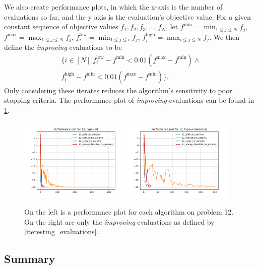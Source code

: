 We also create performance plots, in which the x-axis is the number of evaluations so far, and the y axis is the evaluation's objective value.
For a given constant sequence of objective values $f_1, f_2, f_3, \ldots, f_N$, let 
$f^{\textrm{min}} = \min_{1\le j\le N} f_j$,
$f^{\textrm{max}} = \max_{1\le j\le N} f_j$,
$f^{\textrm{low}}_i = \min_{1\le j\le i} f_j$,
$f^{\textrm{high}}_i = \max_{i \le j\le N} f_j$.
We then define the {\em improving} evaluations to be 
\begin{align}
\bigg\{i \in [N] \bigg | 
f^{\textrm{low}}_i - f^{\textrm{min}} < 0.01\left(f^{\textrm{max}} - f^{\textrm{min}}\right) \wedge \nonumber \\
f^{\textrm{high}}_i - f^{\textrm{min}} < 0.01\left(f^{\textrm{max}} - f^{\textrm{min}}\right)
\bigg\}.
\label{iteresting_evaluations}
\end{align}
Only considering these iterates reduces the algorithm's sensitivity to poor stopping criteria.
The performance plot of {\em improving} evaluations can be found in \cref{example_interesting_performance_profile}.

\begin{figure}[ht]
    \centering
    \includegraphics[width=200px]{images/12_all.png}
    \includegraphics[width=200px]{images/12_interesting.png}
    \caption[Performance plots for problem 12.]{
    	On the left is a performance plot for each algorithm on problem 12.
    	On the right are only the {\em improving} evaluations as defined by \cref{iteresting_evaluations}.
	}
    \label{example_interesting_performance_profile}
\end{figure}



\subsection{Summary}

